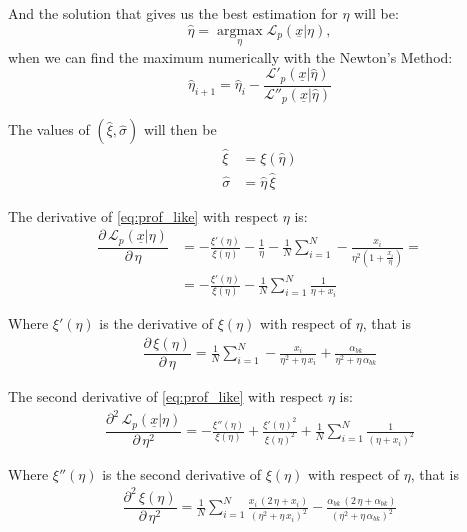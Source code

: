 And the solution that gives us the best estimation for $\eta$ will be:
\begin{equation}
	\hat{\eta} = \operatorname*{arg max}_{\eta} \mathcal{L}_p(\underline{x}|\eta),
\end{equation}
when we can find the maximum numerically with the Newton's Method:
\begin{equation}
	\hat{\eta}_{i+1} = \hat{\eta}_i - \dfrac{\mathcal{L}'_p(\underline{x}|\hat{\eta})}{\mathcal{L}''_p(\underline{x}|\hat{\eta})}
\end{equation}

The values of $(\hat{\xi}, \hat{\sigma})$ will then be
\begin{subequations}
	\begin{align}
		\hat{\xi} &= \xi(\hat{\eta}) \\
		\hat{\sigma} &= \hat{\eta} \, \hat{\xi}
	\end{align}
\end{subequations}

The derivative of \eqref{eq:prof_like} with respect $\eta$ is:
\begin{align}
	\dfrac{ \partial \, \mathcal{L}_p(\underline{x}|\eta) }{ \partial \, \eta}
	  &= - \frac{\xi'(\eta)}{\xi(\eta)} - \frac{1}{\eta} - \frac{1}{N} \sum_{i = 1}^N - \frac{x_i}{\eta^2 \left(1 + \frac{x_i}{\eta}\right)} = \nonumber \\
		&= - \frac{\xi'(\eta)}{\xi(\eta)} - \frac{1}{N} \sum_{i = 1}^N \frac{1}{\eta + x_i}
\end{align}

Where $\xi'(\eta)$ is the derivative of $\xi(\eta)$ with respect of $\eta$, that is
\begin{align}
  \dfrac{ \partial \, \xi(\eta) }{ \partial \, \eta} =
    \frac{1}{N} \sum_{i = 1}^N - \frac{x_i}{\eta^2 + \eta \, x_i} +
    \frac{\alpha_{bk}}{\eta^2 + \eta \, \alpha_{bk}}
\end{align}

The second derivative of \eqref{eq:prof_like} with respect $\eta$ is:
\begin{align}
  \dfrac{ \partial^2 \, \mathcal{L}_p(\underline{x}|\eta) }{ \partial \, \eta^2} =
    - \frac{\xi''(\eta)}{\xi(\eta)}
    + \frac{\xi'(\eta)^2}{\xi(\eta)^2}
    + \frac{1}{N} \sum_{i = 1}^N \frac{1}{(\eta + x_i)^2}
\end{align}

Where $\xi''(\eta)$ is the second derivative of $\xi(\eta)$ with respect of $\eta$, that is
\begin{align}
  \dfrac{ \partial^2 \, \xi(\eta) }{ \partial \, \eta^2} =
    \frac{1}{N} \sum_{i = 1}^N \frac{x_i \, \left(2 \, \eta + x_i\right)}{\left(\eta^2 + \eta \, x_i\right)^2} -
    \frac{\alpha_{bk} \, \left(2 \, \eta + \alpha_{bk}\right)}{\left(\eta^2 + \eta \, \alpha_{bk}\right)^2}
\end{align}

